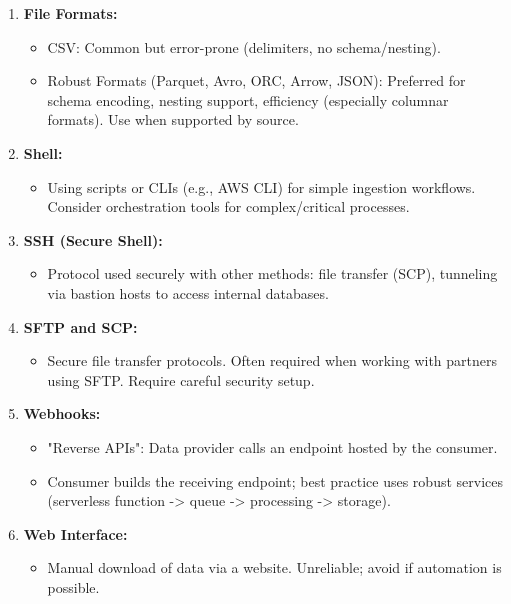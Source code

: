 \begin{enumerate}
    \item \textbf{File Formats:}
    \begin{itemize}[label=\textbullet]
        \item CSV: Common but error-prone (delimiters, no schema/nesting).
        \item Robust Formats (Parquet, Avro, ORC, Arrow, JSON): Preferred for schema encoding, nesting support, efficiency (especially columnar formats). Use when supported by source.
    \end{itemize}

    \item \textbf{Shell:}
    \begin{itemize}[label=\textbullet]
        \item Using scripts or CLIs (e.g., AWS CLI) for simple ingestion workflows. Consider orchestration tools for complex/critical processes.
    \end{itemize}

    \item \textbf{SSH (Secure Shell):}
    \begin{itemize}[label=\textbullet]
        \item Protocol used securely with other methods: file transfer (SCP), tunneling via bastion hosts to access internal databases.
    \end{itemize}

    \item \textbf{SFTP and SCP:}
    \begin{itemize}[label=\textbullet]
        \item Secure file transfer protocols. Often required when working with partners using SFTP. Require careful security setup.
    \end{itemize}

    \item \textbf{Webhooks:}
    \begin{itemize}[label=\textbullet]
        \item "Reverse APIs": Data provider calls an endpoint hosted by the consumer.
        \item Consumer builds the receiving endpoint; best practice uses robust services (serverless function -> queue -> processing -> storage).
    \end{itemize}

    \item \textbf{Web Interface:}
    \begin{itemize}[label=\textbullet]
        \item Manual download of data via a website. Unreliable; avoid if automation is possible.
    \end{itemize}


\end{enumerate}
